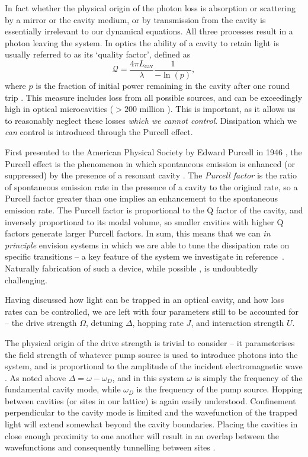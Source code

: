 In fact whether the physical origin of the photon loss is absorption or scattering by a mirror or the cavity medium, or by transmission from the cavity is essentially irrelevant to our dynamical equations. All three processes result in a photon leaving the system. In optics the ability of a cavity to retain light is usually referred to as its `quality factor', defined as
\begin{equation}
	\mathcal{Q} = \frac{4\pi L_{\mathrm{cav}}}{\lambda} \frac{1}{-\ln(p)},
	\label{eq:mbq2-5}
\end{equation}
where \(p\) is the fraction of initial power remaining in the cavity after one round trip \cite{Siegman_chp11}. This measure includes loss from all possible sources, and can be exceedingly high in optical microcavities (\(>200\) million \cite{Yang2017}). This is important, as it allows us to reasonably neglect these losses \emph{which we cannot control}. Dissipation which we \emph{can} control is introduced through the Purcell effect.

First presented to the American Physical Society by Edward Purcell in 1946 \cite{Purcell1946}, the Purcell effect is the phenomenon in which spontaneous emission is enhanced (or suppressed) by the presence of a resonant cavity \cite{Fox_Purcell}. The \emph{Purcell factor} is the ratio of spontaneous emission rate in the presence of a cavity to the original rate, so a Purcell factor greater than one implies an enhancement to the spontaneous emission rate. The Purcell factor is proportional to the Q factor of the cavity, and inversely proportional to its modal volume, so smaller cavities with higher Q factors generate larger Purcell factors. In sum, this means that we can \emph{in principle} envision systems in which we are able to tune the dissipation rate on specific transitions -- a key feature of the system we investigate in reference~\cite{Brown2018}. Naturally fabrication of such a device, while possible \cite{Gerard1998}, is undoubtedly challenging.

Having discussed how light can be trapped in an optical cavity, and how loss rates can be controlled, we are left with four parameters still to be accounted for -- the drive strength \(\Omega\), detuning \(\Delta\), hopping rate \(J\), and interaction strength \(U\).

The physical origin of the drive strength is trivial to consider -- it parameterises the field strength of whatever pump source is used to introduce photons into the system, and is proportional to the amplitude of the incident electromagnetic wave \cite{Fox_Omega}. As noted above \(\Delta = \omega - \omega_{D}\), and in this system \(\omega\) is simply the frequency of the fundamental cavity mode, while \(\omega_{D}\) is the frequency of the pump source. Hopping between cavities (or sites in our lattice) is again easily understood. Confinement perpendicular to the cavity mode is limited and the wavefunction of the trapped light will extend somewhat beyond the cavity boundaries. Placing the cavities in close enough proximity to one another will result in an overlap between the wavefunctions and consequently tunnelling between sites \cite{Hartmann2006,Hartmann2008}.

